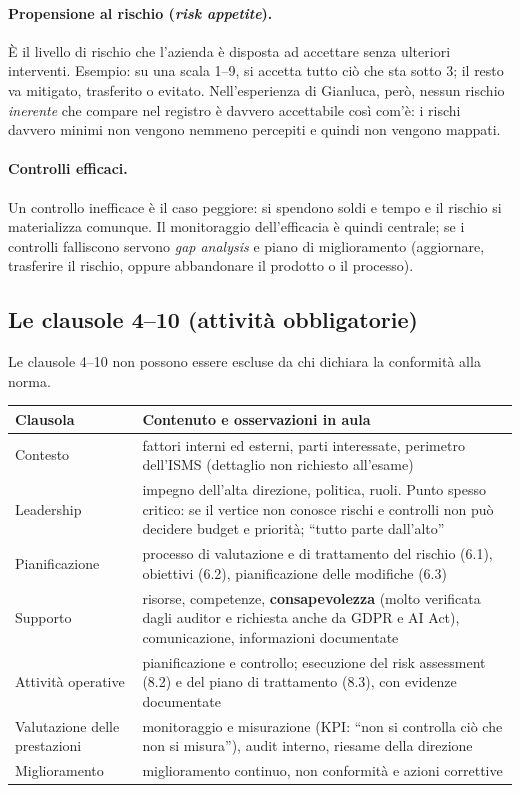 \paragraph{Propensione al rischio (\emph{risk appetite}).} È il livello di rischio che l'azienda è
disposta ad accettare senza ulteriori interventi. Esempio: su una scala 1--9, si accetta tutto ciò che sta
sotto 3; il resto va mitigato, trasferito o evitato. Nell'esperienza di Gianluca, però, nessun rischio
\emph{inerente} che compare nel registro è davvero accettabile così com'è: i rischi davvero minimi non
vengono nemmeno percepiti e quindi non vengono mappati.

\paragraph{Controlli efficaci.} Un controllo inefficace è il caso peggiore: si spendono soldi e tempo e il
rischio si materializza comunque. Il monitoraggio dell'efficacia è quindi centrale; se i controlli
falliscono servono \emph{gap analysis} e piano di miglioramento (aggiornare, trasferire il rischio,
oppure abbandonare il prodotto o il processo).

\subsection{Le clausole 4--10 (attività obbligatorie)}
Le clausole 4--10 non possono essere escluse da chi dichiara la conformità alla norma.
\begin{center}
\small
\begin{tabularx}{\linewidth}{>{\raggedright\arraybackslash}p{3.2cm} X}
\toprule
\textbf{Clausola} & \textbf{Contenuto e osservazioni in aula} \\ \midrule
4 Contesto & fattori interni ed esterni, parti interessate, perimetro dell'ISMS (dettaglio non
  richiesto all'esame) \\
5 Leadership & impegno dell'alta direzione, politica, ruoli. Punto spesso critico: se il vertice non
  conosce rischi e controlli non può decidere budget e priorità; ``tutto parte dall'alto'' \\
6 Pianificazione & processo di valutazione e di trattamento del rischio (6.1), obiettivi (6.2),
  pianificazione delle modifiche (6.3) \\
7 Supporto & risorse, competenze, \textbf{consapevolezza} (molto verificata dagli auditor e richiesta
  anche da GDPR e AI Act), comunicazione, informazioni documentate \\
8 Attività operative & pianificazione e controllo; esecuzione del risk assessment (8.2) e del piano di
  trattamento (8.3), con evidenze documentate \\
9 Valutazione delle prestazioni & monitoraggio e misurazione (KPI: ``non si controlla ciò che non si
  misura''), audit interno, riesame della direzione \\
10 Miglioramento & miglioramento continuo, non conformità e azioni correttive \\ \bottomrule
\end{tabularx}
\end{center}

